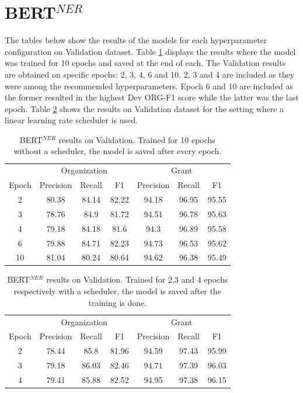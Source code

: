 \documentclass{report}
\theoremstyle{definition}
\theoremstyle{remark}
\begin{document}
\section{BERT$^{NER}$}
\label{sec:app:bertner}
The tables below show the results of the models for each hyperparameter configuration on Validation dataset. Table \ref{tab:bert_ner_no_scheduler} displays the results where the model was trained for 10 epochs and saved at the end of each. The Validation results are obtained on specific epochs: 2, 3, 4, 6 and 10. 2, 3 and 4 are included as they were among the recommended hyperparameters. Epoch 6 and 10 are included as the former resulted in the highest Dev ORG-F1 score while the latter was the last epoch. Table \ref{tab:bert_ner_scheduler} shows the results on Validation dataset for the setting where a linear learning rate scheduler is used.

\begin{table}[h!]
    \centering
    \begin{tabular}{c| c c c| c c c}
    &\multicolumn{3}{c|}{Organization}&\multicolumn{3}{c}{Grant} \\
    Epoch&Precision&Recall&F1&Precision&Recall&F1\\
    \hline
    2     & 80.38	&84.14&82.22	&94.18&	96.95&95.55  \\
    3     & 78.76	&84.9&81.72	&94.51&	96.78&95.63  \\
    4     & 79.18	&84.18&81.6	&94.3&	96.89&95.58  \\
    6     & 79.88	&84.71&82.23	&94.73	&96.53&95.62  \\
    10   &  81.04	&80.24&80.64	&94.62&	96.38&95.49  \\
    \end{tabular}
    \caption{BERT$^{NER}$ results on Validation. Trained for 10 epochs without a scheduler, the model is saved after every epoch.}
    \label{tab:bert_ner_no_scheduler}
\end{table}


\begin{table}[h!]
    \centering
    \begin{tabular}{c| c c c| c c c}
    &\multicolumn{3}{c|}{Organization}&\multicolumn{3}{c}{Grant} \\
    Epoch&Precision&Recall&F1&Precision&Recall&F1\\
    \hline
    2     & 78.44&	85.8&	81.96&	94.59&	97.43&	95.99
 \\
    3     & 79.18&86.03&82.46&94.71&97.39&96.03
 \\
    4     & 79.41&85.88&82.52&94.95&97.38&96.15
 \\
    \end{tabular}
    \caption{BERT$^{NER}$ results on Validation. Trained for 2,3 and 4 epochs respectively with a scheduler, the model is saved after the training is done.}
    \label{tab:bert_ner_scheduler}
\end{table}
\end{document}
